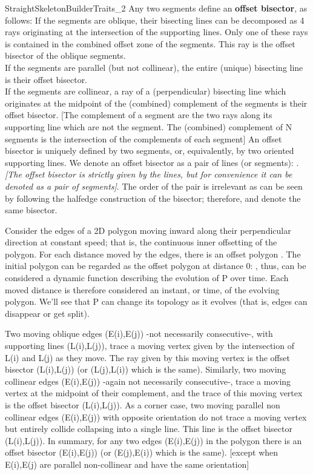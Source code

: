 \begin{ccRefConcept}{StraightSkeletonBuilderTraits_2}
Any two segments define an \textbf{offset bisector}, as follows:
If the segments are oblique, their bisecting lines can be decomposed as 4 rays originating at the intersection of the supporting lines. Only one of these rays is contained in the combined offset zone of the segments. This ray is the offset bisector of the oblique segments.\\
If the segments are parallel (but not collinear), the entire (unique) bisecting line is their offset bisector.\\
If the segments are collinear, a ray of a (perpendicular) bisecting line which originates at the midpoint of the (combined) complement of the segments is their offset bisector. [The complement of a segment are the two rays along its supporting line which are not the segment. The (combined) complement of N segments is the intersection of the complements of each segment]
An offset bisector is uniquely defined by two segments, or, equivalently, by two oriented supporting lines. We denote an offset bisector as a pair of lines (or segments): . \textit{[The offset bisector is strictly given by the lines, but for convenience it can be denoted as a pair of segments]}. The order of the pair is irrelevant as can be seen by following the halfedge construction of the bisector; therefore,  and  denote the same bisector.


Consider the edges of a 2D polygon  moving inward along their perpendicular direction at constant speed; that is, the continuous inner offsetting of the polygon. For each distance  moved by the edges, there is an offset polygon . The initial polygon can be regarded as the offset polygon at distance 0: , thus,  can be considered a dynamic function describing the evolution of P over time. Each moved distance is therefore considered an instant, or time, of the evolving polygon. We'll see that P can change its topology as it evolves (that is, edges can disappear or get split).

Two moving oblique edges (E(i),E(j)) -not necessarily consecutive-, with supporting lines (L(i),L(j)), trace a moving vertex given by the intersection of L(i) and L(j) as they move. The ray given by this moving vertex is the offset bisector (L(i),L(j)) (or (L(j),L(i)) which is the same). Similarly, two moving collinear edges (E(i),E(j)) -again not necessarily consecutive-, trace a moving vertex at the midpoint of their complement, and the trace of this moving vertex is the offset bisector (L(i),L(j)). As a corner case, two moving parallel non collinear edges (E(i),E(j)) with opposite orientation do not trace a moving vertex but entirely collide collapsing into a single line. This line is the offset bisector (L(i),L(j)). In summary, for any two edges (E(i),E(j)) in the polygon there is an offset bisector (E(i),E(j)) (or (E(j),E(i)) which is the same). [except when E(i),E(j) are parallel non-collinear and have the same orientation]


\end{ccRefConcept}
